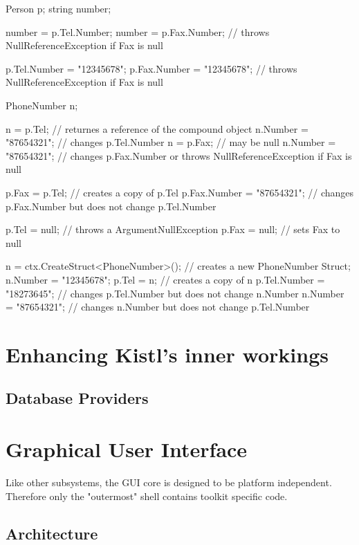 \begin{CS}
Person p;
string number;

number = p.Tel.Number;
number = p.Fax.Number; // throws NullReferenceException if Fax is null

p.Tel.Number = "12345678";
p.Fax.Number = "12345678"; // throws NullReferenceException if Fax is null

PhoneNumber n;

n = p.Tel; // returnes a reference of the compound object
n.Number = "87654321"; // changes p.Tel.Number
n = p.Fax; // may be null
n.Number = "87654321"; // changes p.Fax.Number or throws NullReferenceException if Fax is null

p.Fax = p.Tel; // creates a copy of p.Tel
p.Fax.Number = "87654321"; // changes p.Fax.Number but does not change p.Tel.Number

p.Tel = null; // throws a ArgumentNullException
p.Fax = null; // sets Fax to null

n = ctx.CreateStruct<PhoneNumber>(); // creates a new PhoneNumber Struct;
n.Number = "12345678";
p.Tel = n; // creates a copy of n
p.Tel.Number = "18273645"; // changes p.Tel.Number but does not change n.Number
n.Number = "87654321"; // changes n.Number but does not change p.Tel.Number
\end{CS}

\section{Enhancing Kistl's inner workings}

\subsection{Database Providers}

\section{Graphical User Interface}

Like other subsystems, the GUI core is designed to be platform
independent. Therefore only the "outermost" shell contains toolkit
specific code.

\subsection{Architecture}


